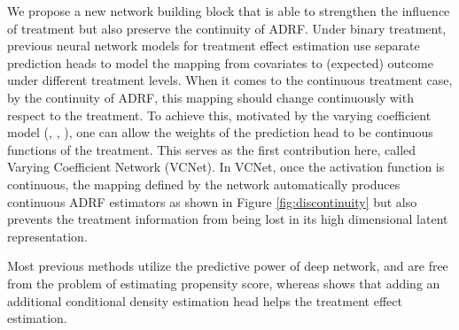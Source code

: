 \documentclass{article} %
\begin{document}

We propose a new network building block that is able to strengthen the influence of treatment but also preserve the continuity of ADRF. Under binary treatment, previous neural network models for treatment effect estimation use separate prediction heads to model the mapping from covariates to (expected) outcome under different treatment levels. When it comes to the continuous treatment case, by the continuity of ADRF, this mapping should change continuously with respect to the treatment. To achieve this, motivated by the varying coefficient model (\cite{hastie1993varying}, \cite{fan1999statistical}, \cite{chiang2001smoothing}), one can allow the weights of the prediction head to be continuous functions of the treatment. 
This serves as the first contribution here, called Varying Coefficient Network (VCNet). In VCNet, once the activation function is continuous, the mapping defined by the network automatically produces continuous ADRF estimators as shown in Figure \ref{fig:discontinuity} but also prevents the treatment information from being lost in its high dimensional latent representation.





\iffalse
Most previous methods utilize the predictive power of deep network, and are free from the problem of estimating propensity score, whereas \cite{shi2019adapting} shows that adding an additional conditional density estimation head helps the treatment effect estimation. 
\end{document}
